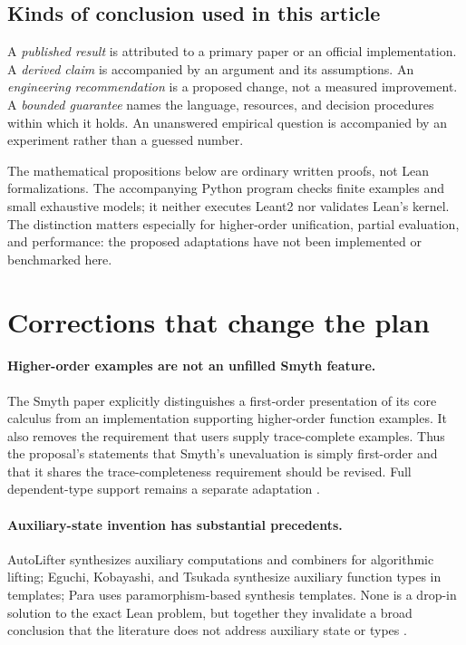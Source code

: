 \subsection{Kinds of conclusion used in this article}
A \emph{published result} is attributed to a primary paper or an official
implementation. A \emph{derived claim} is accompanied by an argument and
its assumptions. An \emph{engineering recommendation} is a proposed change,
not a measured improvement. A \emph{bounded guarantee} names the language,
resources, and decision procedures within which it holds. An unanswered
empirical question is accompanied by an experiment rather than a guessed
number.

The mathematical propositions below are ordinary written proofs, not Lean
formalizations. The accompanying Python program checks finite examples and
small exhaustive models; it neither executes Leant2 nor validates Lean's
kernel. The distinction matters especially for higher-order unification,
partial evaluation, and performance: the proposed adaptations have not been
implemented or benchmarked here.

\section{Corrections that change the plan}\label{sec:corrections}

\paragraph{Higher-order examples are not an unfilled Smyth feature.}
The Smyth paper explicitly distinguishes a first-order presentation of its
core calculus from an implementation supporting higher-order function examples.
It also removes the requirement that users supply trace-complete examples.
Thus the proposal's statements that Smyth's unevaluation is simply first-order
and that it shares the trace-completeness requirement should be revised.
Full dependent-type support remains a separate adaptation \cite{smyth}.

\paragraph{Auxiliary-state invention has substantial precedents.}
AutoLifter synthesizes auxiliary computations and combiners for
algorithmic lifting; Eguchi, Kobayashi, and Tsukada synthesize auxiliary
function types in templates; Para uses paramorphism-based synthesis
templates. None is a drop-in solution to the exact Lean problem, but together
they invalidate a broad conclusion that the literature does not address
auxiliary state or types \cite{autolifter,eguchi,para}.

